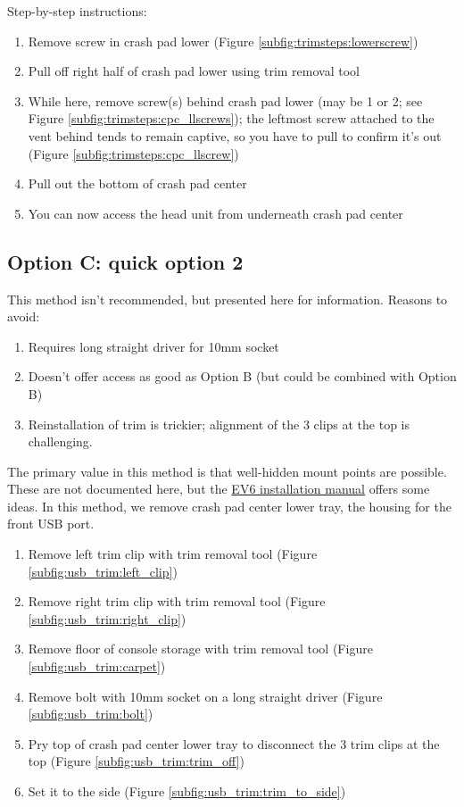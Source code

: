 \documentclass[superscriptaddress,onecolumn,floatfix]{revtex4-2}
\begin{document}
Step-by-step instructions:
\begin{enumerate}
  \item Remove screw in crash pad lower (Figure \ref{subfig:trimsteps:lowerscrew})
  \item Pull off right half of crash pad lower using trim removal tool 
  \item While here, remove screw(s) behind crash pad lower (may be 1 or 2; see Figure \ref{subfig:trimsteps:cpc_llscrews}); the leftmost screw attached to the vent behind tends to remain captive, so you have to pull to confirm it's out (Figure \ref{subfig:trimsteps:cpc_llscrew})
  \item Pull out the bottom of crash pad center
  \item You can now access the head unit from underneath crash pad center
\end{enumerate}

\subsection{Option C: quick option 2}

This method isn't recommended, but presented here for information. Reasons to avoid:
\begin{enumerate}
  \item Requires long straight driver for 10mm socket
  \item Doesn't offer access as good as Option B (but could be combined with Option B)
  \item Reinstallation of trim is trickier; alignment of the 3 clips at the top is challenging. 
\end{enumerate}
The primary value in this method is that well-hidden mount points are possible. These are not documented here, but the \href{https://github.com/tylerharvey/Ioniq5_CAN/blob/main/guides/cars/E-GMP_gen1/EV6/head_unit_preconditioning_kit_EV6_install.pdf}{EV6 installation manual} offers some ideas. In this method, we remove crash pad center lower tray, the housing for the front USB port. 

\begin{enumerate}
  \item Remove left trim clip with trim removal tool (Figure \ref{subfig:usb_trim:left_clip})
  \item Remove right trim clip with trim removal tool (Figure \ref{subfig:usb_trim:right_clip})
  \item Remove floor of console storage with trim removal tool (Figure \ref{subfig:usb_trim:carpet}) 
  \item Remove bolt with 10mm socket on a long straight driver (Figure \ref{subfig:usb_trim:bolt})
  \item Pry top of crash pad center lower tray to disconnect the 3 trim clips at the top (Figure \ref{subfig:usb_trim:trim_off})
  \item Set it to the side (Figure \ref{subfig:usb_trim:trim_to_side})
\end{enumerate}
\end{document}
